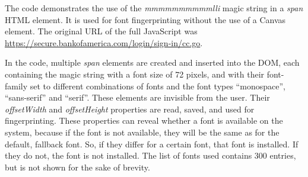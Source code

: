 \documentclass[
    fontsize=12pt,
    headings=small,
    parskip=half,
    bibliography=totoc,
    numbers=noenddot,
    open=any
    ]{scrreprt}
\begin{document}
\begin{appendices}
The code demonstrates the use of the \textit{mmmmmmmmmmlli} magic string in a \textit{span} HTML element.
It is used for font fingerprinting without the use of a Canvas element.
The original URL of the full JavaScript was \url{https://secure.bankofamerica.com/login/sign-in/cc.go}.

In the code, multiple \textit{span} elements are created and inserted into the DOM,
each containing the magic string with a font size of 72 pixels, and with their font-family
set to different combinations of fonts and the font types ``monospace'', ``sans-serif'' and ``serif''.
These elements are invisible from the user.
Their \textit{offsetWidth} and \textit{offsetHeight} properties are read, saved, and
used for fingerprinting.
These properties can reveal whether a font is available on the system, because
if the font is not available, they will be the same as for the default, fallback
font. So, if they differ for a certain font, that font is installed. If they do not,
the font is not installed.
The list of fonts used contains 300 entries, but is not shown for the sake of brevity.


\end{appendices}

\clearpage

\printbibliography
\end{document}
